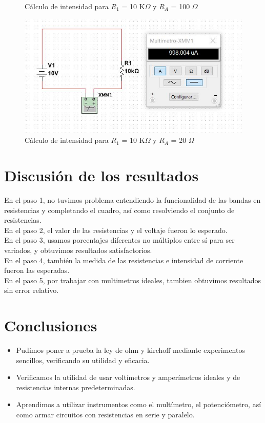 \documentclass[twoside,twocolumn]{article}
\begin{document}
\begin{itemize}
\begin{figure}[h]
    \caption{Cálculo de intensidad para $R_{1}$ = 10 K$\Omega$ y $R_{A}$ = 100 $\Omega$ }
    \label{fig:circuito4}
    \end{figure}
    \begin{figure}[h]
    \centering
    \includegraphics[scale=0.42]{imagenes1/5.2.JPG}
    \caption{Cálculo de intensidad para $R_{1}$ = 10 K$\Omega$ y $R_{A}$ = 20 $\Omega$  }
    \label{fig:circuito4}
    \end{figure}
\end{itemize}

\newpage
\section{Discusión de los resultados}
En el paso 1, no tuvimos problema entendiendo la funcionalidad de las bandas en resistencias y completando el cuadro, así como resolviendo el conjunto de resistencias.\\
En el paso 2, el valor de las resistencias y el voltaje fueron lo esperado. \\En el paso 3, usamos porcentajes diferentes no múltiplos entre sí para ser variados, y obtuvimos resultados satisfactorios.\\ En el paso 4, también la medida de las resistencias e intensidad de corriente fueron las esperadas.
\\En el paso 5, por trabajar con multimetros ideales, tambien obtuvimos resultados sin error relativo.

\section{Conclusiones}
\begin{itemize}
\item Pudimos poner a prueba la ley de ohm y kirchoff mediante experimentos sencillos, verificando su utilidad y eficacia.
\item Verificamos la utilidad de usar voltímetros y amperímetros ideales y de resistencias internas predeterminadas.
\item Aprendimos a utilizar instrumentos como el multímetro, el potenciómetro, así como armar circuitos con resistencias en serie y paralelo.
\end{itemize}
\end{document}
